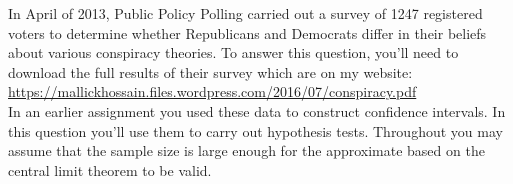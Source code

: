 \documentclass[addpoints,12pt]{exam}\usepackage[]{graphicx}\usepackage[]{color}
\makeatletter
\newcommand{\hlnum}[1]{\textcolor[rgb]{0.686,0.059,0.569}{#1}}%
\newcommand{\hlopt}[1]{\textcolor[rgb]{0,0,0}{#1}}%
\newcommand{\hlstd}[1]{\textcolor[rgb]{0.345,0.345,0.345}{#1}}%
\newcommand{\hlkwb}[1]{\textcolor[rgb]{0.69,0.353,0.396}{#1}}%
\newcommand{\hlkwd}[1]{\textcolor[rgb]{0.737,0.353,0.396}{\textbf{#1}}}%
\newenvironment{kframe}{%
 \def\at@end@of@kframe{}%
 \ifinner\ifhmode%
  \def\at@end@of@kframe{\end{minipage}}%
  \begin{minipage}{\columnwidth}%
 \fi\fi%
 \def\FrameCommand##1{\hskip\@totalleftmargin \hskip-\fboxsep
 \colorbox{shadecolor}{##1}\hskip-\fboxsep
     \hskip-\linewidth \hskip-\@totalleftmargin \hskip\columnwidth}%
 \MakeFramed {\advance\hsize-\width
   \@totalleftmargin\z@ \linewidth\hsize
   \@setminipage}}%
 {\par\unskip\endMakeFramed%
 \at@end@of@kframe}
\newenvironment{knitrout}{}{} %
\makeatother
\begin{document}
\begin{questions}


\question In April of 2013, Public Policy Polling carried out a survey of 1247 registered voters to determine whether Republicans and Democrats differ in their beliefs about various conspiracy theories. To answer this question, you'll need to download the full results of their survey which are on my website:\\
\url{https://mallickhossain.files.wordpress.com/2016/07/conspiracy.pdf}\\
In an earlier assignment you used these data to construct confidence intervals. In this question you'll use them to carry out hypothesis tests. Throughout you may assume that the sample size is large enough for the approximate based on the central limit theorem to be valid.
	\begin{parts}

\end{parts}
\end{questions}
\end{document}
